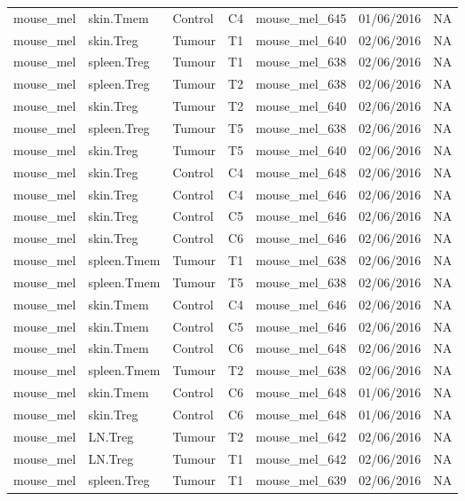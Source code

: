 \begin{table}[htp!]
\begin{tabular}{lllllll}
  mouse\_mel & skin.Tmem & Control & C4 & mouse\_mel\_645 & 01/06/2016 & NA \\ 
  mouse\_mel & skin.Treg & Tumour & T1 & mouse\_mel\_640 & 02/06/2016 & NA \\ 
  mouse\_mel & spleen.Treg & Tumour & T1 & mouse\_mel\_638 & 02/06/2016 & NA \\ 
  mouse\_mel & spleen.Treg & Tumour & T2 & mouse\_mel\_638 & 02/06/2016 & NA \\ 
  mouse\_mel & skin.Treg & Tumour & T2 & mouse\_mel\_640 & 02/06/2016 & NA \\ 
  mouse\_mel & spleen.Treg & Tumour & T5 & mouse\_mel\_638 & 02/06/2016 & NA \\ 
  mouse\_mel & skin.Treg & Tumour & T5 & mouse\_mel\_640 & 02/06/2016 & NA \\ 
  mouse\_mel & skin.Treg & Control & C4 & mouse\_mel\_648 & 02/06/2016 & NA \\ 
  mouse\_mel & skin.Treg & Control & C4 & mouse\_mel\_646 & 02/06/2016 & NA \\ 
  mouse\_mel & skin.Treg & Control & C5 & mouse\_mel\_646 & 02/06/2016 & NA \\ 
  mouse\_mel & skin.Treg & Control & C6 & mouse\_mel\_646 & 02/06/2016 & NA \\ 
  mouse\_mel & spleen.Tmem & Tumour & T1 & mouse\_mel\_638 & 02/06/2016 & NA \\ 
  mouse\_mel & spleen.Tmem & Tumour & T5 & mouse\_mel\_638 & 02/06/2016 & NA \\ 
  mouse\_mel & skin.Tmem & Control & C4 & mouse\_mel\_646 & 02/06/2016 & NA \\ 
  mouse\_mel & skin.Tmem & Control & C5 & mouse\_mel\_646 & 02/06/2016 & NA \\ 
  mouse\_mel & skin.Tmem & Control & C6 & mouse\_mel\_648 & 02/06/2016 & NA \\ 
  mouse\_mel & spleen.Tmem & Tumour & T2 & mouse\_mel\_638 & 02/06/2016 & NA \\ 
  mouse\_mel & skin.Tmem & Control & C6 & mouse\_mel\_648 & 01/06/2016 & NA \\ 
  mouse\_mel & skin.Treg & Control & C6 & mouse\_mel\_648 & 01/06/2016 & NA \\ 
  mouse\_mel & LN.Treg & Tumour & T2 & mouse\_mel\_642 & 02/06/2016 & NA \\ 
  mouse\_mel & LN.Treg & Tumour & T1 & mouse\_mel\_642 & 02/06/2016 & NA \\ 
  mouse\_mel & spleen.Treg & Tumour & T1 & mouse\_mel\_639 & 02/06/2016 & NA \\ 

\end{tabular}
\end{table}
